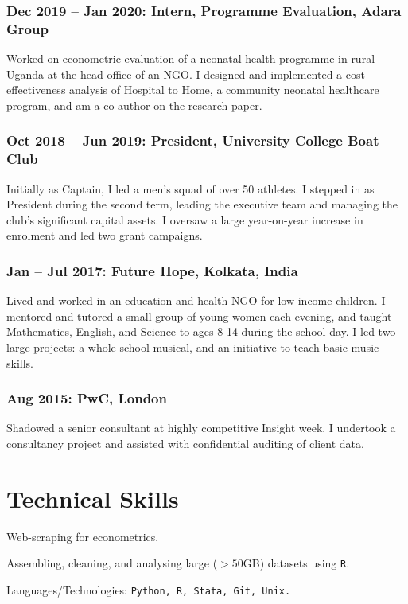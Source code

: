 \documentclass[a4]{article}
\renewenvironment{itemize}{
  \begin{list}{}{
    \setlength{\leftmargin}{1.5em}
  }
}{
  \end{list}
}
\begin{document}
\subsubsection*{Dec 2019 -- Jan 2020: Intern, Programme Evaluation, Adara Group}
Worked on econometric evaluation of a neonatal health programme in rural Uganda at the head office of an NGO. I designed and implemented a cost-effectiveness analysis of Hospital to Home, a community neonatal healthcare program, and am a co-author on the research paper.
\subsubsection*{Oct 2018 -- Jun 2019: President, University College Boat Club}
Initially as Captain, I led a men’s squad of over 50 athletes. I stepped in as President during the second term, leading the executive team and managing the club’s significant capital assets. I oversaw a large year-on-year increase in enrolment and led two grant campaigns.
\subsubsection*{Jan -- Jul 2017: Future Hope, Kolkata, India}
Lived and worked in an education and health NGO for low-income children. I mentored and tutored a small group of young women each evening, and taught Mathematics, English, and Science to ages 8-14 during the school day. I led two large projects: a whole-school musical, and an initiative to teach basic music skills. 
\subsubsection*{Aug 2015: PwC, London}
Shadowed a senior consultant at highly competitive Insight week. I undertook a consultancy project and assisted with confidential auditing of client data.

\section*{Technical Skills}
\begin{itemize}
	\item Web-scraping for econometrics.
	\item Assembling, cleaning, and analysing large (\(>50\)GB) datasets using \texttt{R}.
	\item Languages/Technologies: \tt Python, R, Stata, Git, Unix.
\end{itemize}
\end{document}
